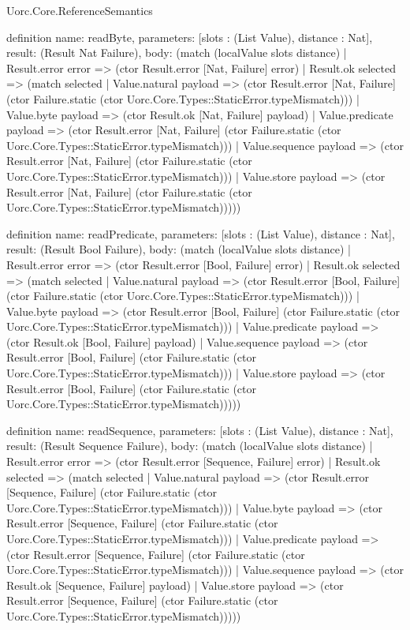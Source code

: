 \begin{lexlean}{Uorc.Core.ReferenceSemantics}
\begin{semanticmodule}
definition{
  name: readByte,
  parameters: [slots : (List Value), distance : Nat],
  result: (Result Nat Failure),
  body: (match (localValue slots distance)
    | Result.error error => (ctor Result.error [Nat, Failure] error)
    | Result.ok selected => (match selected
      | Value.natural payload => (ctor Result.error [Nat, Failure] (ctor Failure.static (ctor Uorc.Core.Types::StaticError.typeMismatch)))
      | Value.byte payload => (ctor Result.ok [Nat, Failure] payload)
      | Value.predicate payload => (ctor Result.error [Nat, Failure] (ctor Failure.static (ctor Uorc.Core.Types::StaticError.typeMismatch)))
      | Value.sequence payload => (ctor Result.error [Nat, Failure] (ctor Failure.static (ctor Uorc.Core.Types::StaticError.typeMismatch)))
      | Value.store payload => (ctor Result.error [Nat, Failure] (ctor Failure.static (ctor Uorc.Core.Types::StaticError.typeMismatch)))))
}

definition{
  name: readPredicate,
  parameters: [slots : (List Value), distance : Nat],
  result: (Result Bool Failure),
  body: (match (localValue slots distance)
    | Result.error error => (ctor Result.error [Bool, Failure] error)
    | Result.ok selected => (match selected
      | Value.natural payload => (ctor Result.error [Bool, Failure] (ctor Failure.static (ctor Uorc.Core.Types::StaticError.typeMismatch)))
      | Value.byte payload => (ctor Result.error [Bool, Failure] (ctor Failure.static (ctor Uorc.Core.Types::StaticError.typeMismatch)))
      | Value.predicate payload => (ctor Result.ok [Bool, Failure] payload)
      | Value.sequence payload => (ctor Result.error [Bool, Failure] (ctor Failure.static (ctor Uorc.Core.Types::StaticError.typeMismatch)))
      | Value.store payload => (ctor Result.error [Bool, Failure] (ctor Failure.static (ctor Uorc.Core.Types::StaticError.typeMismatch)))))
}

definition{
  name: readSequence,
  parameters: [slots : (List Value), distance : Nat],
  result: (Result Sequence Failure),
  body: (match (localValue slots distance)
    | Result.error error => (ctor Result.error [Sequence, Failure] error)
    | Result.ok selected => (match selected
      | Value.natural payload => (ctor Result.error [Sequence, Failure] (ctor Failure.static (ctor Uorc.Core.Types::StaticError.typeMismatch)))
      | Value.byte payload => (ctor Result.error [Sequence, Failure] (ctor Failure.static (ctor Uorc.Core.Types::StaticError.typeMismatch)))
      | Value.predicate payload => (ctor Result.error [Sequence, Failure] (ctor Failure.static (ctor Uorc.Core.Types::StaticError.typeMismatch)))
      | Value.sequence payload => (ctor Result.ok [Sequence, Failure] payload)
      | Value.store payload => (ctor Result.error [Sequence, Failure] (ctor Failure.static (ctor Uorc.Core.Types::StaticError.typeMismatch)))))
}


\end{semanticmodule}
\end{lexlean}
